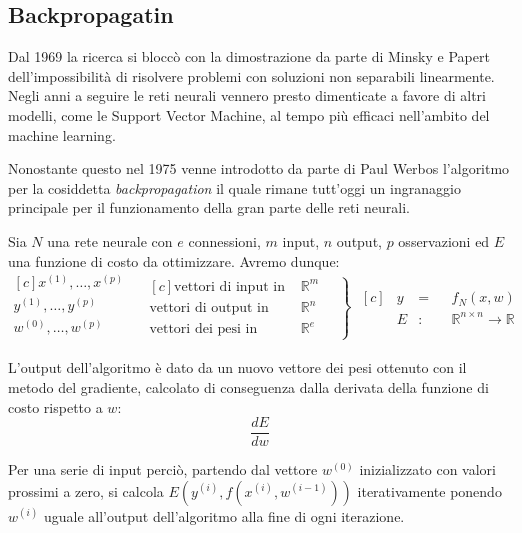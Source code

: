 \subsection{Backpropagatin}
Dal 1969 la ricerca si bloccò con la dimostrazione da parte di Minsky e Papert~\cite{minsky1972} dell'impossibilità di risolvere problemi con soluzioni non separabili linearmente.
Negli anni a seguire le reti neurali vennero presto dimenticate a favore di altri modelli, come le Support Vector Machine, al tempo più efficaci nell'ambito del machine learning.\par
Nonostante questo nel 1975 venne introdotto da parte di Paul Werbos l'algoritmo per la cosiddetta \textit{backpropagation} il quale rimane tutt'oggi un ingranaggio principale per il funzionamento della gran parte delle reti neurali.

Sia $N$ una rete neurale con $e$ connessioni, $m$ input, $n$ output, $p$ osservazioni ed $E$ una funzione di costo da ottimizzare. Avremo dunque:
\begin{equation*}
	\begin{aligned}[c]
		x^{(1)},\dots,x^{(p)} \\
		y^{(1)},\dots,y^{(p)} \\
		w^{(0)},\dots,w^{(p)} \\
	\end{aligned}
	\quad
	\left.\begin{aligned}[c]
		\text{vettori di input in } &\mathbb{R}^m \\
		\text{vettori di output in } &\mathbb{R}^n \\
		\text{vettori dei pesi in } &\mathbb{R}^e
	\end{aligned}\quad \right\}
	\;
	\begin{aligned}[c]
		&y &=& &f_{N}(x,w) \\
		&E &\colon& &\mathbb{R}^{n \times n} \rightarrow \mathbb{R}
	\end{aligned}
\end{equation*}

L'output dell'algoritmo è dato da un nuovo vettore dei pesi ottenuto con il metodo del gradiente, calcolato di conseguenza dalla derivata della funzione di costo rispetto a $w$:
$$
\frac{d E}{d w}
$$

Per una serie di input perciò, partendo dal vettore $w^{(0)}$ inizializzato con valori prossimi a zero, si calcola $E(y^{(i)}, f(x^{(i)}, w^{(i-1)}))$ iterativamente ponendo $w^{(i)}$ uguale all'output dell'algoritmo alla fine di ogni iterazione.


